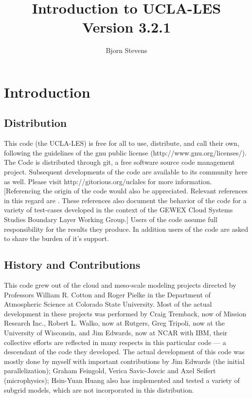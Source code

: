 \documentclass[11pt,a4paper]{article}
\begin{document}
\title{\centering \Huge \baselineskip30mm Introduction to UCLA-LES \\ \large Version 3.2.1}
\baselineskip7mm
\bigskip
\author{\LARGE Bjorn Stevens \\ } 
\maketitle

\baselineskip6mm

\newpage
\tableofcontents
\newpage

\normalsize
\section{Introduction}

\subsection{Distribution}
This code (the UCLA-LES) is free for all to use, distribute, and call
their own, following the guidelines of the gnu public license (http://www.gnu.org/licenses/).
The Code is distributed through git, a free software source code management project.
Subsequent developments of the code are available to its community here as well.
Please visit http://gitorious.org/uclales for more information.
[Referencing the origin of the code would also be appreciated. Relevant references in
this regard are \cite{Me:1999a,Me:2005b,Me:2008}.  These references
also document the behavior of the code for a variety of test-cases
developed in the context of the GEWEX Cloud Systems Studies Boundary
Layer Working Group.]
Users of the code assume full responsibility for the results they produce.
In addition users of the code are asked to share the burden of it's support.

\subsection{History and Contributions}
This code grew out of the cloud and meso-scale modeling projects
directed by Professors William R. Cotton and Roger Pielke in the
Department of Atmospheric Science at Colorado State University.
Most of the actual development in these projects was performed
by Craig Tremback, now of Mission Research Inc., Robert
L. Walko, now at Rutgers, Greg Tripoli, now at the University of
Wisconsin, and Jim Edwards, now at NCAR with IBM, their collective
efforts are reflected in many respects in this particular code --- a
descendant of the code they developed.  The actual development of this
code was mostly done by myself with important contributions by Jim
Edwards (the initial parallelization); Graham Feingold, Verica
Savic-Jovcic and Axel Seifert (microphysics); Hsin-Yuan Huang also has
implemented and tested a variety of subgrid models, which are not
incorporated in this distribution.
\end{document}
